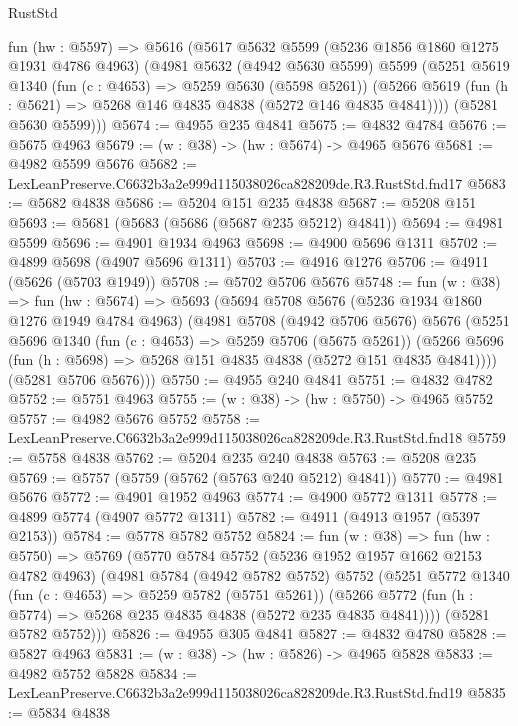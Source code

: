 \begin{lexlean}{RustStd}
\begin{coremodule}
  fun (hw : @5597) =>
  @5616
    (@5617
      @5632
      @5599
      (@5236 @1856 @1860 @1275 @1931 @4786 @4963)
      (@4981
        @5632
        (@4942 @5630 @5599)
        @5599
        (@5251
          @5619
          @1340
          (fun (c : @4653) => @5259 @5630 (@5598 @5261))
          (@5266 @5619 (fun (h : @5621) => @5268 @146 @4835 @4838 (@5272 @146 @4835 @4841))))
        (@5281 @5630 @5599)))
@5674 := @4955 @235 @4841
@5675 := @4832 @4784
@5676 := @5675 @4963
@5679 := (w : @38) -> (hw : @5674) -> @4965 @5676
@5681 := @4982 @5599 @5676
@5682 := LexLeanPreserve.C6632b3a2e999d115038026ca828209de.R3.RustStd.fnd17
@5683 := @5682 @4838
@5686 := @5204 @151 @235 @4838
@5687 := @5208 @151
@5693 := @5681 (@5683 (@5686 (@5687 @235 @5212) @4841))
@5694 := @4981 @5599
@5696 := @4901 @1934 @4963
@5698 := @4900 @5696 @1311
@5702 := @4899 @5698 (@4907 @5696 @1311)
@5703 := @4916 @1276
@5706 := @4911 (@5626 (@5703 @1949))
@5708 := @5702 @5706 @5676
@5748 := fun (w : @38) =>
  fun (hw : @5674) =>
  @5693
    (@5694
      @5708
      @5676
      (@5236 @1934 @1860 @1276 @1949 @4784 @4963)
      (@4981
        @5708
        (@4942 @5706 @5676)
        @5676
        (@5251
          @5696
          @1340
          (fun (c : @4653) => @5259 @5706 (@5675 @5261))
          (@5266 @5696 (fun (h : @5698) => @5268 @151 @4835 @4838 (@5272 @151 @4835 @4841))))
        (@5281 @5706 @5676)))
@5750 := @4955 @240 @4841
@5751 := @4832 @4782
@5752 := @5751 @4963
@5755 := (w : @38) -> (hw : @5750) -> @4965 @5752
@5757 := @4982 @5676 @5752
@5758 := LexLeanPreserve.C6632b3a2e999d115038026ca828209de.R3.RustStd.fnd18
@5759 := @5758 @4838
@5762 := @5204 @235 @240 @4838
@5763 := @5208 @235
@5769 := @5757 (@5759 (@5762 (@5763 @240 @5212) @4841))
@5770 := @4981 @5676
@5772 := @4901 @1952 @4963
@5774 := @4900 @5772 @1311
@5778 := @4899 @5774 (@4907 @5772 @1311)
@5782 := @4911 (@4913 @1957 (@5397 @2153))
@5784 := @5778 @5782 @5752
@5824 := fun (w : @38) =>
  fun (hw : @5750) =>
  @5769
    (@5770
      @5784
      @5752
      (@5236 @1952 @1957 @1662 @2153 @4782 @4963)
      (@4981
        @5784
        (@4942 @5782 @5752)
        @5752
        (@5251
          @5772
          @1340
          (fun (c : @4653) => @5259 @5782 (@5751 @5261))
          (@5266 @5772 (fun (h : @5774) => @5268 @235 @4835 @4838 (@5272 @235 @4835 @4841))))
        (@5281 @5782 @5752)))
@5826 := @4955 @305 @4841
@5827 := @4832 @4780
@5828 := @5827 @4963
@5831 := (w : @38) -> (hw : @5826) -> @4965 @5828
@5833 := @4982 @5752 @5828
@5834 := LexLeanPreserve.C6632b3a2e999d115038026ca828209de.R3.RustStd.fnd19
@5835 := @5834 @4838

\end{coremodule}
\end{lexlean}

